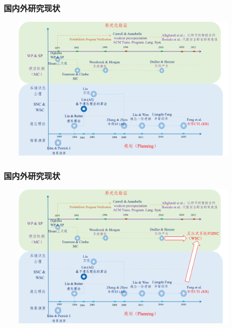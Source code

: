 \documentclass[aspectratio=1610, 9pt, CJK]{beamer}
\begin{document}
	\begin{frame}
	\frametitle{~国内外研究现状}
	\begin{figure}
		\includegraphics[scale=0.45]{figures/historyc}
	\end{figure}
\end{frame}
	\begin{frame}
		\frametitle{~国内外研究现状}
		\begin{figure}
			\includegraphics[scale=0.45]{figures/historyd}
		\end{figure}
	\end{frame}
\end{document}
